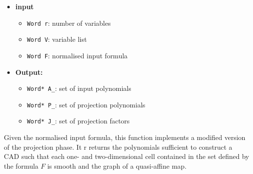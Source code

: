 \documentclass[
]{book}
\providecommand{\tightlist}{%
  \setlength{\itemsep}{0pt}\setlength{\parskip}{0pt}}
\theoremstyle{definition}
\theoremstyle{definition}
\theoremstyle{definition}
\theoremstyle{definition}
\theoremstyle{remark}
\begin{document}
\begin{itemize}
\tightlist
\item
  \textbf{input}

  \begin{itemize}
  \tightlist
  \item
    \texttt{Word\ r}: number of variables
  \item
    \texttt{Word\ V}: variable list
  \item
    \texttt{Word\ F}: normalised input formula
  \end{itemize}
\item
  \textbf{Output:}

  \begin{itemize}
  \tightlist
  \item
    \texttt{Word*\ A\_}: set of input polynomials
  \item
    \texttt{Word*\ P\_}: set of projection polynomials
  \item
    \texttt{Word*\ J\_}: set of projection factors
  \end{itemize}
\end{itemize}

Given the normalised input formula, this function implements a modified version of the projection phase. It r returns the polynomials sufficient to construct a CAD such that each one- and two-dimensional cell contained in the set defined by the formula \(F\) is smooth and the graph of a quasi-affine map.
\end{document}
